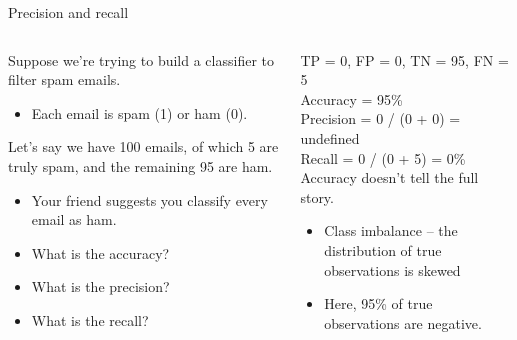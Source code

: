 \documentclass[aspectratio=169]{../latex_main/tntbeamer}  %
\begin{document}
	\begin{frame}{Precision and recall}
	  \begin{columns}
	        \begin{column}{.5\textwidth}
                 Suppose we’re trying to build a classifier to filter spam emails.
        	    \begin{itemize}
        	        \item Each email is spam (1) or ham (0).
        	    \end{itemize}
        	    Let’s say we have 100 emails, of which 5 are truly spam, and the remaining 95 are ham.
        	    \begin{itemize}
        	        \item Your friend suggests you classify every email as ham.
        	        \item What is the accuracy?
        	        \item What is the precision?
        	        \item What is the recall?
        	    \end{itemize}
	        \end{column}
	        
	        
	        \begin{column}{.5\textwidth}
	               TP = 0, FP = 0, TN = 95, FN = 5\\
	               \bigskip
	               Accuracy = 95\%\\
	               Precision = 0 / (0 + 0) = undefined\\
	               Recall = 0 / (0 + 5) = 0\%\\
	               \bigskip
	               Accuracy doesn’t tell the full story.
                    \begin{itemize}
                        \item Class imbalance – the distribution of true observations is skewed
                        \item Here, 95\% of true observations are negative.
                    \end{itemize}
	        \end{column}
	    \end{columns}
	\end{frame}
	
\end{document}
